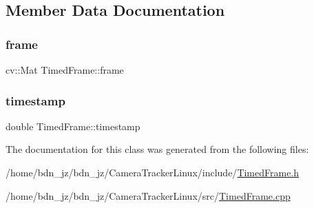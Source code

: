 \subsection{Member Data Documentation}
\mbox{\label{class_timed_frame_a4c73ac094ec94f9be6558208b4916a36}} 
\subsubsection{\texorpdfstring{frame}{frame}}
{\footnotesize\ttfamily cv\+::\+Mat Timed\+Frame\+::frame}

\mbox{\label{class_timed_frame_a126b8150949e1bd734778de55496b90c}} 
\subsubsection{\texorpdfstring{timestamp}{timestamp}}
{\footnotesize\ttfamily double Timed\+Frame\+::timestamp}



The documentation for this class was generated from the following files\+:\begin{DoxyCompactItemize}
\item 
/home/bdn\+\_\+jz/bdn\+\_\+jz/\+Camera\+Tracker\+Linux/include/\hyperlink{_timed_frame_8h}{Timed\+Frame.\+h}\item 
/home/bdn\+\_\+jz/bdn\+\_\+jz/\+Camera\+Tracker\+Linux/src/\hyperlink{_timed_frame_8cpp}{Timed\+Frame.\+cpp}\end{DoxyCompactItemize}
